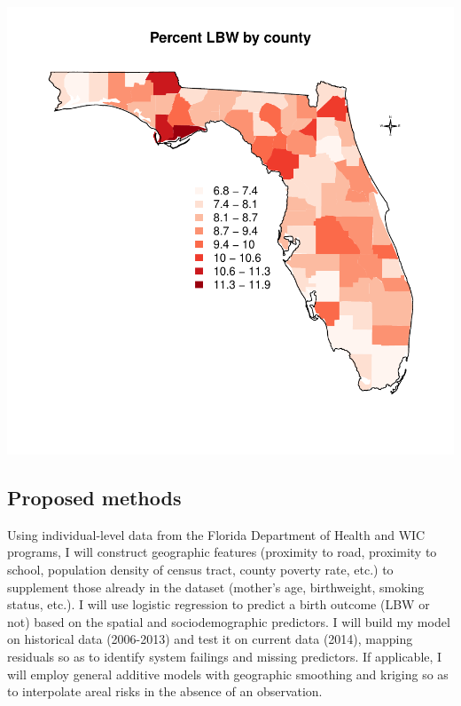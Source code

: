 \documentclass[11pt]{article}
\begin{document}
\begin{multicols}{2}
\includegraphics{final_project_proposal_joe_brew-001}

\subsection*{Proposed methods}
Using individual-level data from the Florida Department of Health and WIC programs, I will construct geographic features (proximity to road, proximity to school, population density of census tract, county poverty rate, etc.) to supplement those already in the dataset (mother's age, birthweight, smoking status, etc.).  I will use logistic regression to predict a birth outcome (LBW or not) based on the spatial and sociodemographic predictors.  I will build my model on historical data (2006-2013) and test it on current data (2014), mapping residuals so as to identify system failings and missing predictors.  If applicable, I will employ general additive models with geographic smoothing and kriging so as to interpolate areal risks in the absence of an observation.






\end{multicols}
\newpage


\end{document}
